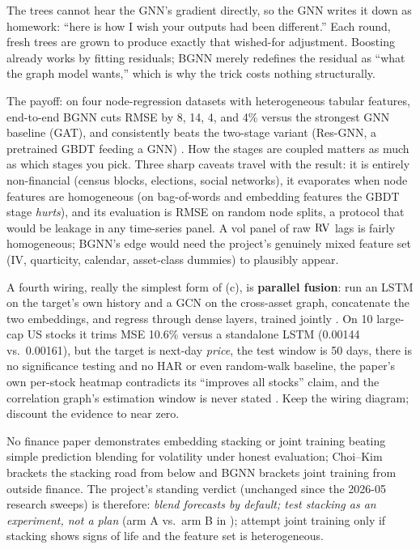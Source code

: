 \begin{intuition}
The trees cannot hear the GNN's gradient directly, so the GNN writes it down as homework: ``here is how I wish your outputs had been different.'' Each round, fresh trees are grown to produce exactly that wished-for adjustment. Boosting already works by fitting residuals; BGNN merely redefines the residual as ``what the graph model wants,'' which is why the trick costs nothing structurally.
\end{intuition}

The payoff: on four node-regression datasets with heterogeneous tabular features, end-to-end BGNN cuts RMSE by 8, 14, 4, and 4\% versus the strongest GNN baseline (GAT), and consistently beats the two-stage variant (Res-GNN, a pretrained GBDT feeding a GNN) \citep[Table~2, p.~6]{IvanovProkhorenkova2021}. How the stages are coupled matters as much as which stages you pick. Three sharp caveats travel with the result: it is entirely non-financial (census blocks, elections, social networks), it evaporates when node features are homogeneous (on bag-of-words and embedding features the GBDT stage \emph{hurts}), and its evaluation is RMSE on random node splits, a protocol that would be leakage in any time-series panel. A vol panel of raw $\operatorname{RV}$ lags is fairly homogeneous; BGNN's edge would need the project's genuinely mixed feature set (IV, quarticity, calendar, asset-class dummies) to plausibly appear.

A fourth wiring, really the simplest form of (c), is \textbf{parallel fusion}: run an LSTM on the target's own history and a GCN on the cross-asset graph, concatenate the two embeddings, and regress through dense layers, trained jointly \citep{SonaniBadiiMoin2025}. On 10 large-cap US stocks it trims MSE 10.6\% versus a standalone LSTM (0.00144 vs.\ 0.00161), but the target is next-day \emph{price}, the test window is 50 days, there is no significance testing and no HAR or even random-walk baseline, the paper's own per-stock heatmap contradicts its ``improves all stocks'' claim, and the correlation graph's estimation window is never stated \citep[\S4.5--4.6, Figs.~4--6]{SonaniBadiiMoin2025}. Keep the wiring diagram; discount the evidence to near zero.

\begin{projectconnection}
No finance paper demonstrates embedding stacking or joint training beating simple prediction blending for volatility under honest evaluation; Choi--Kim brackets the stacking road from below and BGNN brackets joint training from outside finance. The project's standing verdict (unchanged since the 2026-05 research sweeps) is therefore: \emph{blend forecasts by default; test stacking as an experiment, not a plan} (arm A vs.\ arm B in ); attempt joint training only if stacking shows signs of life and the feature set is heterogeneous.
\end{projectconnection}

